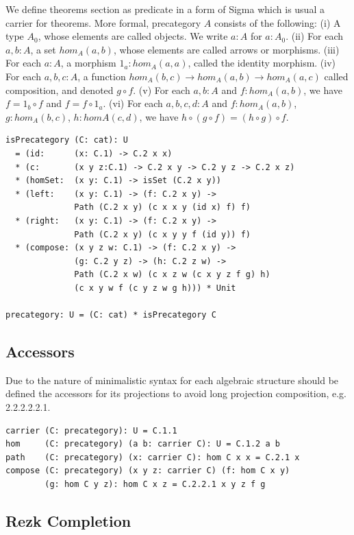 \documentclass{article}
\begin{document}
We define theorems section as predicate in a form of Sigma
which is usual a carrier for theorems. More formal, precategory $A$ consists of the following:
(i)   A type $A_0$, whose elements are called objects. We write $a: A$ for $a: A_0$.
(ii)  For each $a,b: A$, a set $hom_A(a,b)$, whose elements are called arrows or morphisms.
(iii) For each $a: A$, a morphism $1_a : hom_A(a,a)$, called the identity morphism.
(iv)  For each $a,b,c: A$, a function $hom_A(b,c) \rightarrow hom_A(a,b) \rightarrow hom_A(a,c)$
      called composition, and denoted $g \circ f$.
(v)   For each $a,b: A$ and $f: hom_A(a,b)$, we have $f = 1_b \circ f$ and $f = f \circ 1_a$.
(vi)  For each $a,b,c,d: A$ and $f: hom_A(a,b)$, $g: hom_A(b,c)$, $h: homA(c,d)$,
      we have $h \circ (g \circ f ) = (h \circ g) \circ f$.

\begin{lstlisting}[mathescape=true]
isPrecategory (C: cat): U
  = (id:      (x: C.1) -> C.2 x x)
  * (c:       (x y z:C.1) -> C.2 x y -> C.2 y z -> C.2 x z)
  * (homSet:  (x y: C.1) -> isSet (C.2 x y))
  * (left:    (x y: C.1) -> (f: C.2 x y) ->
              Path (C.2 x y) (c x x y (id x) f) f)
  * (right:   (x y: C.1) -> (f: C.2 x y) ->
              Path (C.2 x y) (c x y y f (id y)) f)
  * (compose: (x y z w: C.1) -> (f: C.2 x y) ->
              (g: C.2 y z) -> (h: C.2 z w) ->
              Path (C.2 x w) (c x z w (c x y z f g) h)
              (c x y w f (c y z w g h))) * Unit

precategory: U = (C: cat) * isPrecategory C
\end{lstlisting}

\subsection{Accessors}

Due to the nature of minimalistic syntax for each algebraic structure
should be defined the accessors for its projections to avoid long projection
composition, e.g. 2.2.2.2.2.1.

\begin{lstlisting}[mathescape=true]
carrier (C: precategory): U = C.1.1
hom     (C: precategory) (a b: carrier C): U = C.1.2 a b
path    (C: precategory) (x: carrier C): hom C x x = C.2.1 x
compose (C: precategory) (x y z: carrier C) (f: hom C x y)
        (g: hom C y z): hom C x z = C.2.2.1 x y z f g
\end{lstlisting}

\subsection{Rezk Completion}
\end{document}
